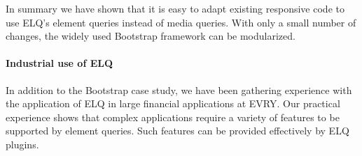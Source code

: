 \documentclass{acm_proc_article-sp}
\newcommand{\code}[1]{\texttt{#1}}
\newcommand{\elq}{ELQ}
\newcommand{\gls}[1]{#1}
\begin{document}

    In summary we have shown that it is easy to adapt existing responsive code to use \elq{}'s element queries instead of media queries.
    With only a small number of changes, the widely used Bootstrap framework can be modularized.

    \paragraph{Industrial use of \elq{}}
    In addition to the Bootstrap case study, we have been gathering experience with the application of \elq{} in large financial applications at EVRY.
    Our practical experience shows that complex applications require a variety of features to be supported by element queries.
    Such features can be provided effectively by \elq{} plugins.
\end{document}
